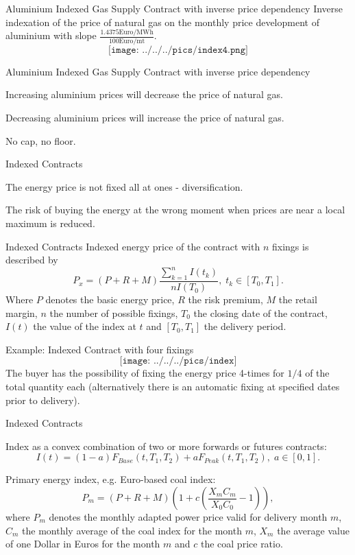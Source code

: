 {Aluminium Indexed Gas Supply Contract with inverse price dependency}
Inverse indexation of the price of natural gas on the monthly price development of aluminium with slope $\frac{1.4375\text{Euro/MWh}}{100\text{Euro/mt}}$.
$$\texttt{[image: ../../../pics/index4.png]}$$

{Aluminium Indexed Gas Supply Contract with inverse price dependency}
  \item<1-> Increasing aluminium prices will decrease the price of natural gas.
  \item<2-> Decreasing aluminium prices will increase the price of natural gas.
  \item<3-> No cap, no floor.

{Indexed Contracts}
  \item The energy price is not fixed all at ones - diversification.
  \item The risk of buying the energy at the wrong moment when prices are near a local maximum is reduced.

{Indexed Contracts}
Indexed energy price of the contract with $n$ fixings is described by
$$P_x=(P+R+M)\frac{\sum_{k=1}^n{I(t_k)}}{nI(T_0)},\;t_k\in[T_0,T_1].$$
Where $P$ denotes the basic energy price, $R$ the risk premium, $M$ the retail margin, $n$ the number of possible fixings,
$T_0$ the closing date of the contract, $I(t)$ the value of the index at $t$ and $[T_0,T_1]$ the delivery period.

{Example: Indexed Contract with four fixings}
$$\texttt{[image: ../../../pics/index]}$$
The buyer has the possibility of fixing the energy price 4-times for $1/4$ of the total quantity each (alternatively there is an automatic fixing at specified dates prior to delivery).

{Indexed Contracts}
  \item<1-> Index as a convex combination of two or more forwards or futures contracts:
  $$I(t)=(1-a)F_{Base}(t,T_1,T_2)+aF_{Peak}(t,T_1,T_2),\;a\in[0,1].$$
  \item<2-> Primary energy index, e.g. Euro-based coal index:
  $$P_m=(P+R+M)\left(1+c\left(\frac{X_mC_m}{X_0C_0}-1\right)\right),$$
  where $P_m$ denotes the monthly adapted power price valid for delivery month $m$, $C_m$ the monthly average of the coal index for the month $m$, $X_m$ the average value of one Dollar in Euros for the month $m$ and $c$ the coal price ratio.

